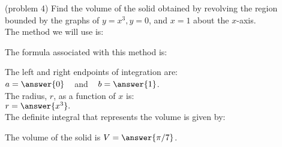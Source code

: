 \documentclass{ximera}
\begin{document}
\begin{problem}(problem 4)
Find the volume of the solid obtained by revolving the region bounded by the graphs of $y = x^3, y = 0$, and $x = 1$ about the $x$-axis.\\
The method we will use is:
\begin{multipleChoice}
\end{multipleChoice}

The formula associated with this method is:
\begin{multipleChoice}
\end{multipleChoice}

The left and right endpoints of integration are:\\
$a = \answer{0}\;\;\;$ and $\;\;\; b = \answer{1}$.\\
The radius, $r$, as a function of $x$ is:\\
$r = \answer{x^3}.$\\

The definite integral that represents the volume is given by:\\
\begin{multipleChoice}
\end{multipleChoice}

The volume of the solid is $V = \answer{\pi/7}$.

\end{problem}
\end{document}
